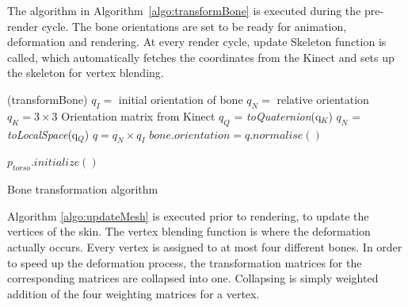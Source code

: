 The algorithm in Algorithm~\ref{algo:transformBone} is executed during the pre-render cycle. The bone orientations are set to be ready for animation, deformation and rendering. At every render cycle, update Skeleton function is called, which automatically fetches the coordinates from the Kinect and sets up the skeleton for vertex blending. 

\begin{algorithm}[ht]
\DontPrintSemicolon %
\function(transformBone){
$q_I =$ initial orientation of bone\;
$q_N =$ relative orientation\;
$q_K = 3\times3$ Orientation matrix from Kinect\;
 {
  $q_Q$ = \textit{toQuaternion}(q$_K$)\;
  $q_N$ = \textit{toLocalSpace}(q$_Q$)\;
  $q = q_N \times q_I$\;
  $\textit{bone.orientation} = \textit{q.normalise}{\left(\right)}$\; }}

 {
  $p_\textit{torso}.\textit{initialize}()$  \;
 }
\caption{Bone transformation algorithm}
\label{algo:transformBone}
\end{algorithm}

Algorithm \ref{algo:updateMesh} is executed prior to rendering, to update the vertices of the skin. The vertex blending function is where the deformation
actually occurs. Every vertex is assigned to at most four different bones. In order to speed up the deformation process, the transformation matrices for the corresponding matrices are collapsed into one. Collapsing is simply weighted addition of the four weighting matrices for a vertex.


